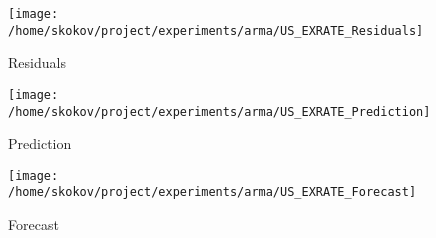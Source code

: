 \begin{figure}[h!]%
\centering%
\texttt{[image: /home/skokov/project/experiments/arma/US\_EXRATE\_Residuals]}%
\caption{Residuals}%
\label{fig:US_EXRATE_Residuals}%
\end{figure}

%


\begin{figure}[h!]%
\centering%
\texttt{[image: /home/skokov/project/experiments/arma/US\_EXRATE\_Prediction]}%
\caption{Prediction}%
\label{fig:US_EXRATE_Prediction}%
\end{figure}

%


\begin{figure}[h!]%
\centering%
\texttt{[image: /home/skokov/project/experiments/arma/US\_EXRATE\_Forecast]}%
\caption{Forecast}%
\label{fig:US_EXRATE_Forecast}%
\end{figure}


